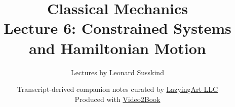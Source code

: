 \documentclass[11pt,oneside]{book}
\begin{document}
\hypersetup{pageanchor=false}
\frontmatter
\title{Classical Mechanics\\[0.45em]
\large Lecture 6: Constrained Systems and Hamiltonian Motion}
\author{Lectures by Leonard Susskind}
\date{Transcript-derived companion notes curated by
\href{https://lazying.art}{LazyingArt LLC}\\[0.35em]
\small Produced with
\href{https://github.com/lachlanchen/Video2Book}{Video2Book}}
\maketitle
\hypersetup{pageanchor=true}
\mainmatter

\end{document}
